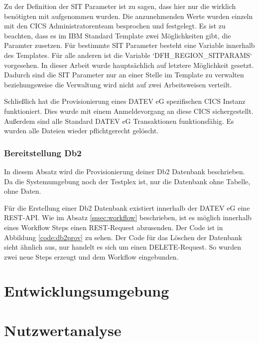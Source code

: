 Zu der Definition der SIT Parameter ist zu sagen, dass hier nur die wirklich benötigten mit aufgenommen wurden.
Die anzunehmenden Werte wurden einzeln mit den CICS Administratorenteam besprochen und festgelegt.
Es ist zu beachten, dass es im IBM Standard Template zwei Möglichkeiten gibt, die Paramter zusetzen.
Für bestimmte SIT Parameter besteht eine Variable innerhalb des Templates.
Für alle anderen ist die Variable `DFH\_REGION\_SITPARAMS` vorgesehen.
In dieser Arbeit wurde hauptsächlich auf letztere Möglichkeit gesetzt.
Dadurch sind die SIT Parameter nur an einer Stelle im Template zu verwalten beziehungsweise die Verwaltung wird nicht auf zwei Arbeitsweisen verteilt.

Schließlich hat die Provisionierung eines DATEV eG spezifischen CICS Instanz funktioniert.
Dies wurde mit einem Anmeldevorgang an diese CICS sichergestellt.
Außerdem sind alle Standard DATEV eG Transaktionen funktionsfähig.
Es wurden alle Dateien wieder pflichtgerecht gelöscht.

\subsubsection{Bereitstellung Db2}
In diesem Absatz wird die Provisionierung deiner Db2 Datenbank beschrieben.
Da die Systemumgebung noch der Testplex ist, nur die Datenbank ohne Tabelle, ohne Daten.

Für die Erstellung einer Db2 Datenbank existiert innerhalb der DATEV eG eine REST-API.
Wie im Absatz \ref{sssec:workflow} beschrieben, ist es möglich innerhalb eines Workflow Steps einen REST-Request abzusenden.
Der Code ist in Abbildung \ref{code:db2prov} zu sehen.
Der Code für das Löschen der Datenbank sieht ähnlich aus, nur handelt es sich um einen DELETE-Request.
So wurden zwei neue Steps erzeugt und dem Workflow eingebunden.


\section{Entwicklungsumgebung}

\section{Nutzwertanalyse}

